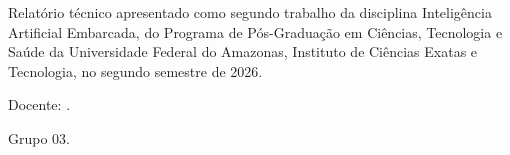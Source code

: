 \begin{titlepage}
\thispagestyle{empty}
\begin{center}
\ReportAuthors

\vspace{2cm}
{\Large\bfseries\ReportTitle\par}
\end{center}
\vspace{1.7cm}
\begin{flushright}
\begin{minipage}{0.62\textwidth}
Relatório técnico apresentado como segundo trabalho da disciplina Inteligência
Artificial Embarcada, do Programa de Pós-Graduação em Ciências, Tecnologia e
Saúde da Universidade Federal do Amazonas, Instituto de Ciências Exatas e
Tecnologia, no segundo semestre de 2026.

\medskip
Docente: \ReportTeacher.

\medskip
Grupo 03.
\end{minipage}
\end{flushright}
\vfill
\begin{center}
\ReportPlace\\
\ReportYear
\end{center}
\end{titlepage}



